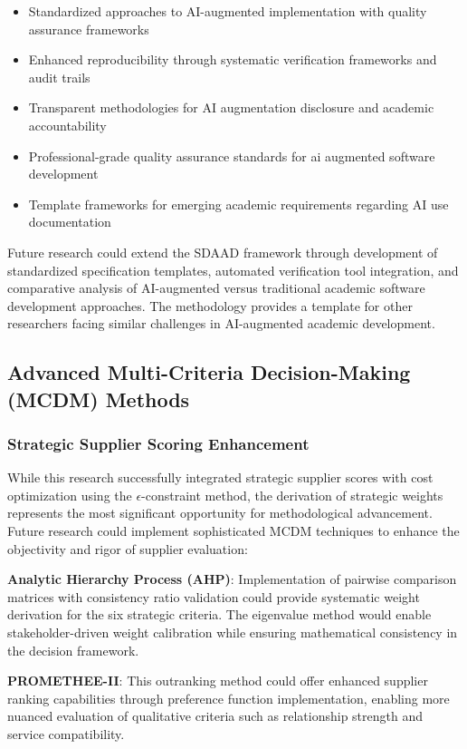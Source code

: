 \begin{itemize}
    \item Standardized approaches to AI-augmented implementation with quality assurance frameworks 
    \item Enhanced reproducibility through systematic verification frameworks and audit trails
    \item Transparent methodologies for AI augmentation disclosure and academic accountability
    \item Professional-grade quality assurance standards for ai augmented software development
    \item Template frameworks for emerging academic requirements regarding AI use documentation
\end{itemize}

Future research could extend the SDAAD framework through development of standardized specification templates, automated verification tool integration, and comparative analysis of AI-augmented versus traditional academic software development approaches. The methodology provides a template for other researchers facing similar challenges in AI-augmented academic development.

\subsection{Advanced Multi-Criteria Decision-Making (MCDM) Methods}

\subsubsection{Strategic Supplier Scoring Enhancement}
While this research successfully integrated strategic supplier scores with cost optimization using the $\epsilon$-constraint method, the derivation of strategic weights represents the most significant opportunity for methodological advancement. Future research could implement sophisticated MCDM techniques to enhance the objectivity and rigor of supplier evaluation:

\textbf{Analytic Hierarchy Process (AHP)}: Implementation of pairwise comparison matrices with consistency ratio validation could provide systematic weight derivation for the six strategic criteria. The eigenvalue method would enable stakeholder-driven weight calibration while ensuring mathematical consistency in the decision framework.

\textbf{PROMETHEE-II}: This outranking method could offer enhanced supplier ranking capabilities through preference function implementation, enabling more nuanced evaluation of qualitative criteria such as relationship strength and service compatibility.

